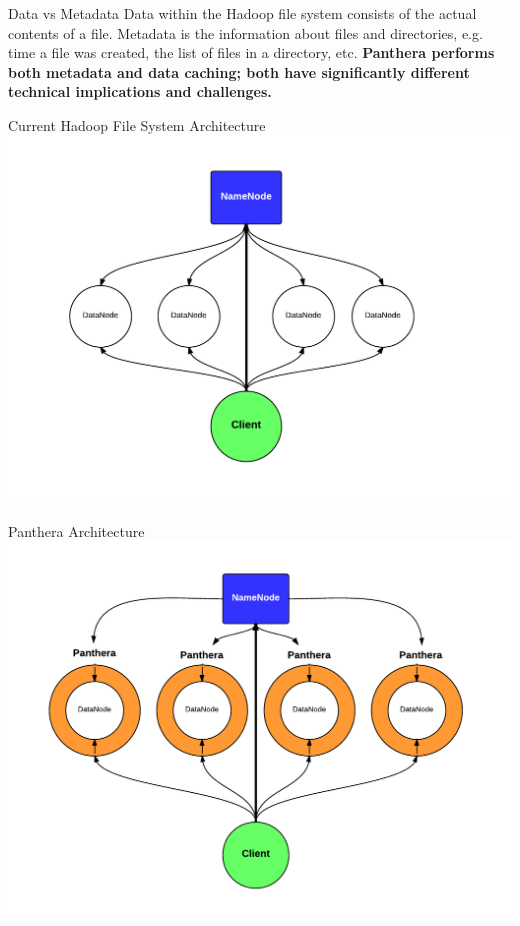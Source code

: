 \documentclass[final]{beamer} %
\begin{document}
\begin{frame}
\begin{columns}[t]
\begin{column}{0.32\textwidth}
		\begin{block}{Data vs Metadata}
			Data within the Hadoop file system consists of the actual contents of a file.
			Metadata is the information about files and directories, e.g. time a file was created, the list of files in a directory, etc. \textbf{Panthera performs both metadata
			and data caching; both have significantly different technical implications
			and challenges.}
		\end{block}
	
		\begin{block}{Current Hadoop File System Architecture}
			\includegraphics[scale=1]{assets/hadoop_architecture.pdf}
		\end{block}
		
	  \begin{block}{Panthera Architecture}
		\includegraphics[scale=1]{assets/panthera_architecture_complete.pdf}	  
	  \end{block}
	  

\end{column}
\end{columns}
\end{frame}
\end{document}
